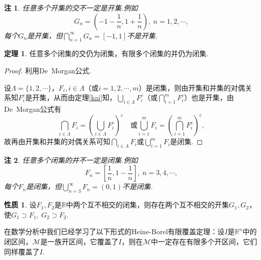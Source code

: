 \documentclass[lang=cn,12pt]{ctexart}
\theoremstyle{definition}
\newtheorem{theorem}{定理}
\newtheorem{proposition}{性质}
\theoremstyle{plain}
\newtheorem*{remark}{注}
\begin{document}
\begin{remark}
	任意多个开集的交不一定是开集.例如
	$$G_n=\left(-1-\frac{1}{n},1+\frac{1}{n}\right),\ n=1,2,\cdots,$$
	每个$G_n$是开集，但$\bigcap\limits_{n=1}^{\infty}G_n=\left[-1,1\right]$不是开集.
\end{remark}
\begin{theorem}
	任意多个闭集的交仍为闭集，有限多个闭集的并仍为闭集.
\end{theorem}
\begin{proof}
	利用De\ Morgan公式.
	
	设$\Lambda=\{1,2,\cdots\}$，$F_i, i\in\Lambda$（或$i=1,2,\cdots,m$）是闭集，则由开集和并集的对偶关系知$F_i^c$是开集，从而由定理\ref{kai}知，$\bigcup\limits_{i\in\Lambda}F_i^c$（或$\bigcap\limits_{i=1}^{m}F_i^c$）也是开集，由De\ Morgan公式有
	$$\bigcap\limits_{i\in\Lambda}F_i=(\bigcup\limits_{i\in\Lambda}F_i^c)^c\quad\text{或}\bigcup\limits_{i=1}^{m}F_i=(\bigcap\limits_{i=1}^{m}F_i^c)^c,$$
	故再由开集和并集的对偶关系可知$\bigcap\limits_{i\in\Lambda}F_i$或$\bigcup\limits_{i=1}^{m}F_i$是闭集.
\end{proof}
\begin{remark}
	任意多个闭集的并不一定是闭集.例如
	$$F_n=\left[\frac{1}{n},1-\frac{1}{n}\right],\ n=3,4,\cdots,$$
	每个$F_n$是闭集，但$\bigcup\limits_{n=3}^{\infty}F_n=(0,1)$不是闭集.
\end{remark}
\begin{proposition}
	设$F_1,F_2$是$\mathbb{R}$中两个互不相交的闭集，则存在两个互不相交的开集$G_1,G_2$，使$G_1\supset F_1,\ G_2\supset F_2$.
\end{proposition}
在数学分析中我们已经学习了以下形式的Heine-Borel有限覆盖定理：设$I$是$\mathbb{R}^n$中的闭区间，$\mathcal{M}$是一族开区间，它覆盖了$I$，则在$\mathcal{M}$中一定存在有限多个开区间，它们同样覆盖了$I$.
\end{document}
